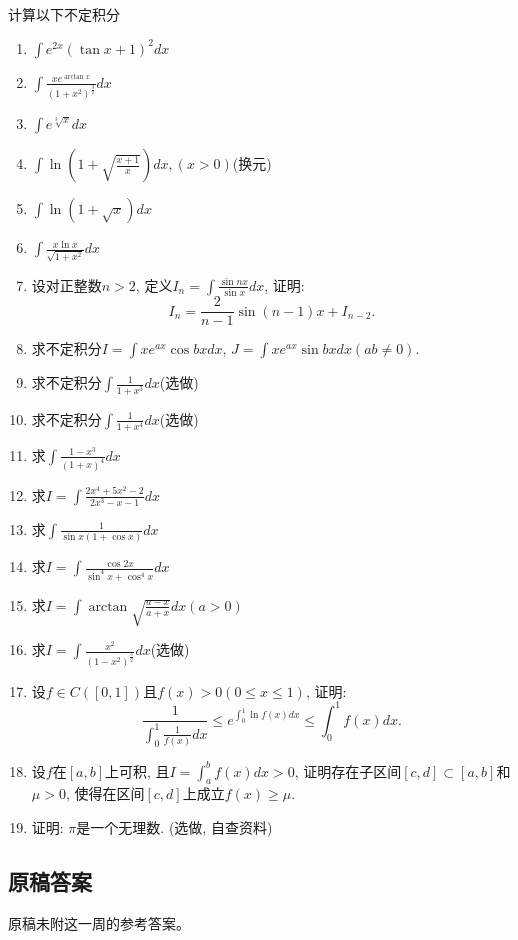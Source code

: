 \documentclass[UTF8,11pt, a4paper, oneside, fontset=none]{ctexbook}
\begin{document}
计算以下不定积分
\begin{enumerate}
\item $\int e^{2x} (\tan x +1)^2 dx$
\item $\int \frac{xe^{\arctan x}}{(1 + x^2)^{\frac{3}{2}}}dx$
\item $\int e^{\sqrt[3]{x}}dx$
\item $\int \ln \left( 1 + \sqrt{\frac{x+1}{x}}\right)dx, (x > 0)$(换元)
\item $ \int \ln(1 + \sqrt x)dx$
\item $\int \frac{x \ln x}{\sqrt{1 + x^2}}dx$
\item 设对正整数$n > 2$, 定义$I_n = \int \frac{\sin n x}{\sin x}dx$, 证明:
\[
I_n = \frac{2}{n-1} \sin (n-1) x + I_{n-2}.
\]
\item 求不定积分$I = \int x e^{ax} \cos b x dx$, $J = \int xe^{ax} \sin b x dx(ab \neq 0)$.
\item 求不定积分$\int \frac{1}{1 + x^3}dx$(选做)
\item 求不定积分$\int \frac{1}{1 + x^4}dx$(选做)
\item 求$\int \frac{1-x^3}{(1 + x)^4}dx$
\item 求$I = \int \frac{2x^4 + 5x^2 -2}{2x^3 - x - 1}dx$
\item 求$\int \frac{1}{\sin x (1 + \cos x)}dx$
\item 求$I = \int \frac{\cos 2x}{\sin^4 x + \cos^4 x}dx$
\item 求$I = \int \arctan \sqrt{\frac{a-x}{a+x}} dx (a > 0)$
\item 求$I = \int \frac{x^2}{(1 - x^2)^{\frac{3}{2}}}dx$(选做)
\item 设$f \in C([0, 1])$且$f(x) > 0 (0 \leq x \leq 1)$, 证明:
\[
\frac{1}{\int_0^1 \frac{1}{f(x)}dx} \leq e^{\int_0^1 \ln f(x) dx} \leq \int_0^1 f(x) dx.
\]
\item 设$f$在$[a, b]$上可积, 且$I = \int_a^b f(x) dx >0$, 证明存在子区间$[c, d] \subset [a, b]$和$\mu>0$, 使得在区间$[c, d]$上成立$f(x) \geq \mu$.
\item 证明: $\pi$是一个无理数. (选做, 自查资料)
\end{enumerate}

\clearpage

\subsection*{原稿答案}

\noindent 原稿未附这一周的参考答案。

\clearpage
\end{document}
